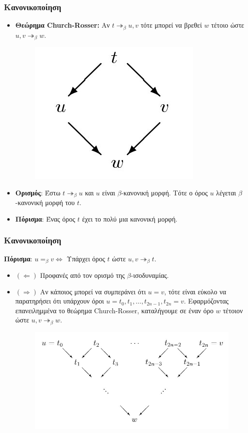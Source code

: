 \documentclass{beamer}
\begin{document}
\begin{frame}
  \frametitle{Κανονικοποίηση}
  \begin{itemize}
  \item \textbf{Θεώρημα Church-Rosser:} Αν $t \twoheadrightarrow
    _\beta u, v$ τότε μπορεί να βρεθεί $w$ τέτοιο ώστε $ u, v
    \twoheadrightarrow _\beta w$.
    \begin{figure}
      \includegraphics[scale=0.3]{CR.jpg} 
    \end{figure} \pause
  \item \textbf{Ορισμός}: Έστω $t \twoheadrightarrow _\beta u$ και $u$
    είναι $\beta$-κανονική μορφή. Τότε ο όρος $u$ λέγεται
    $\beta$-κανονική μορφή του $t$.
  \item \textbf{Πόρισμα}: Ένας όρος $t$ έχει το πολύ μια κανονική
    μορφή.
  \end{itemize}
\end{frame}

\begin{frame}
  \frametitle{Κανονικοποίηση}
  \textbf{Πόρισμα}: $u =_\beta v \Leftrightarrow$ Υπάρχει όρος $t$
  ώστε $u, v \twoheadrightarrow _\beta t$.
  \begin{itemize}
  \item $(\Leftarrow)$ Προφανές από τον ορισμό της $\beta$-ισοδυναμίας.
  \item $(\Rightarrow)$ Aν κάποιος μπορεί να συμπεράνει ότι $u = v$,
    τότε είναι εύκολο να παρατηρήσει ότι υπάρχουν όροι $u = t_0,
    t_1,\ldots, t_{2n-1}, t_{2n} = v$. Εφαρμόζοντας επανειλημμένα το
    θεώρημα Church-Rosser, καταλήγουμε σε έναν όρο $w$ τέτοιον ώστε
    $u, v \twoheadrightarrow _\beta w$.
    \begin{figure} [!ht]
      \centering
      \includegraphics[scale=0.3] {CR1.jpg}
    \end{figure}
  \end{itemize}
\end{frame}
\end{document}

